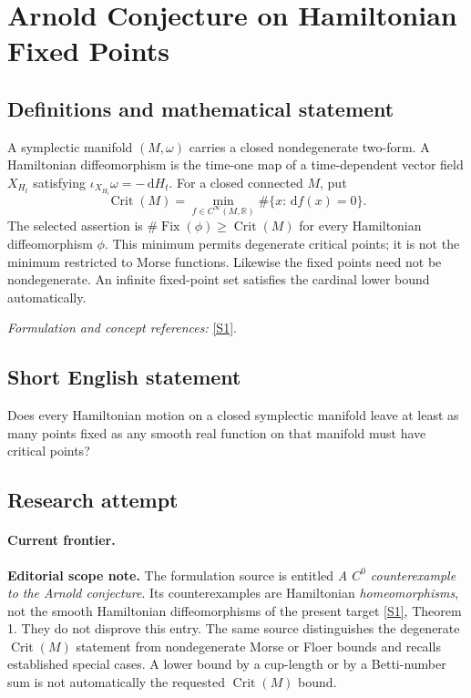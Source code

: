 \documentclass[11pt,a4paper]{article}
\newcommand{\R}{\mathbb{R}}
\newcommand{\dd}{\,\mathrm d}
\newcommand{\sref}[2]{\hyperlink{source:#1:#2}{[S#2]}}
\newif\ifshowcatalogue
\newcommand{\cataloguescope}[1]{\ifshowcatalogue
 \paragraph{Exact scope in the supplied catalogue.}
 \begin{quote}\small #1\end{quote}\fi}
\numberwithin{equation}{section}
\begin{document}
\setcounter{section}{0}
\clearpage
\section*{\texorpdfstring{Arnold Conjecture on Hamiltonian Fixed Points}{Arnold Conjecture on Hamiltonian Fixed Points}}\label{30006772}
\subsection{Definitions and mathematical statement}
A symplectic manifold $(M,\omega)$ carries a closed nondegenerate two-form. A Hamiltonian diffeomorphism is the time-one map of a time-dependent vector field $X_{H_t}$ satisfying $\iota_{X_{H_t}}\omega=-\dd H_t$. For a closed connected $M$, put
\[
 \operatorname{Crit}(M)=\min_{f\in C^\infty(M,\R)}\#\{x:\dd f(x)=0\}.
\]
The selected assertion is $\#\operatorname{Fix}(\phi)\ge\operatorname{Crit}(M)$ for every Hamiltonian diffeomorphism $\phi$. This minimum permits degenerate critical points; it is not the minimum restricted to Morse functions. Likewise the fixed points need not be nondegenerate. An infinite fixed-point set satisfies the cardinal lower bound automatically.
\par\smallskip\textit{Formulation and concept references:} \sref{30006772}{1}.
\cataloguescope{Prove that every Hamiltonian diffeomorphism of an arbitrary closed connected symplectic manifold has at least Crit(M) fixed points, where Crit(M) is the minimum number of critical points of a smooth function on M.}
\subsection{Short English statement}
Does every Hamiltonian motion on a closed symplectic manifold leave at least as many points fixed as any smooth real function on that manifold must have critical points?
\subsection{Research attempt}

\paragraph{Current frontier.}
\textbf{Editorial scope note.} The formulation source is entitled
\emph{A $C^0$ counterexample to the Arnold conjecture}. Its counterexamples
are Hamiltonian \emph{homeomorphisms}, not the smooth Hamiltonian
diffeomorphisms of the present target \sref{30006772}{1}, Theorem 1. They do
not disprove this entry. The same source distinguishes the degenerate
$\operatorname{Crit}(M)$ statement from nondegenerate Morse or Floer
bounds and recalls established special cases. A lower bound by a cup-length
or by a Betti-number sum is not automatically the requested
$\operatorname{Crit}(M)$ bound.
\end{document}
